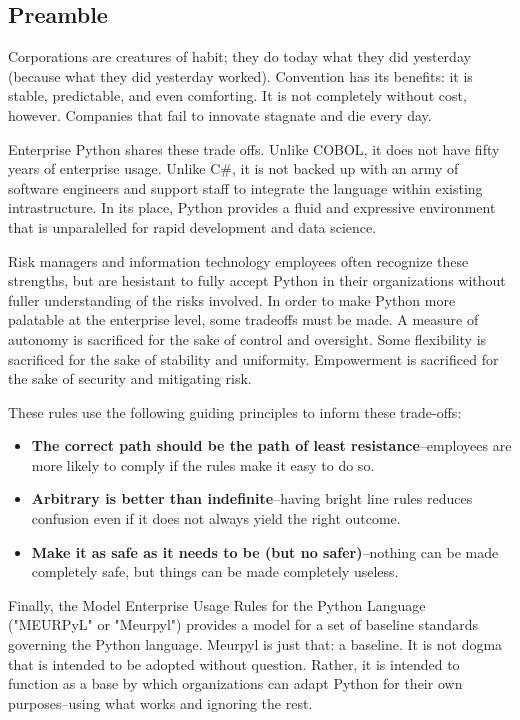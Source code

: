 

\subsection{Preamble}

Corporations are creatures of habit; they do today what they did yesterday (because what they did yesterday worked). Convention has its benefits: it is stable, predictable, and even comforting. It is not completely without cost, however. Companies that fail to innovate stagnate and die every day.

Enterprise Python shares these trade offs. Unlike COBOL, it does not have fifty years of enterprise usage. Unlike C\#, it is not backed up with an army of software engineers and support staff to integrate the language within existing intrastructure. In its place, Python provides a fluid and expressive environment that is unparalelled for rapid development and data science.

Risk managers and information technology employees often recognize these strengths, but are hesistant to fully accept Python in their organizations without fuller understanding of the risks involved. In order to make Python more palatable at the enterprise level, some tradeoffs must be made. A measure of autonomy is sacrificed for the sake of control and oversight. Some flexibility is sacrificed for the sake of stability and uniformity. Empowerment is sacrificed for the sake of security and mitigating risk. 

These rules use the following guiding principles to inform these trade-offs:

\begin{itemize}
	\item \textbf{The correct path should be the path of least resistance}--employees are more likely to comply if the rules make it easy to do so.
	\item \textbf{Arbitrary is better than indefinite}--having bright line rules reduces confusion even if it does not always yield the right outcome.
	\item \textbf{Make it as safe as it needs to be (but no safer)}--nothing can be made completely safe, but things can be made completely useless.
\end{itemize}

Finally, the Model Enterprise Usage Rules for the Python Language ("MEURPyL" or "Meurpyl") provides a model for a set of baseline standards governing the Python language. Meurpyl is just that: a baseline. It is not dogma that is intended to be adopted without question. Rather, it is intended to function as a base by which organizations can adapt Python for their own purposes--using what works and ignoring the rest.
